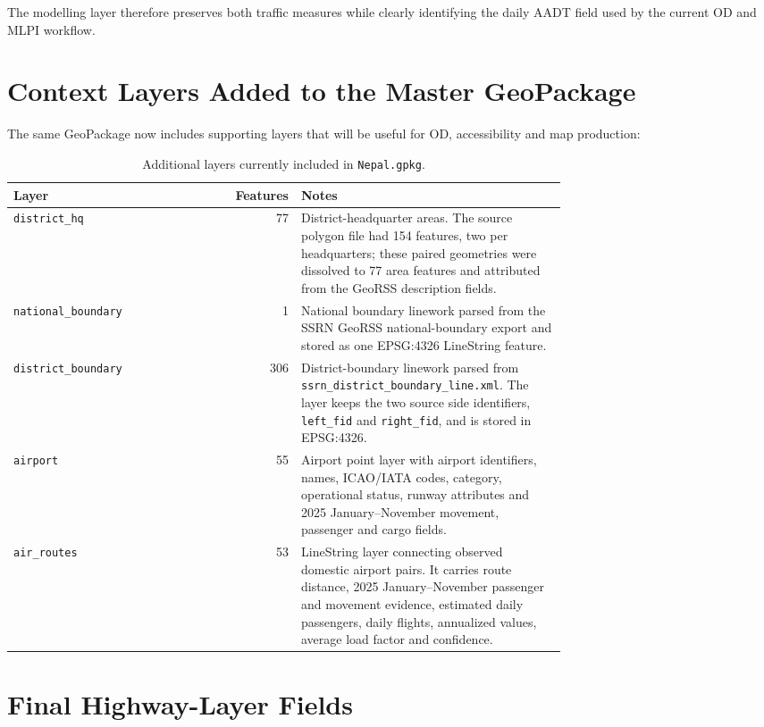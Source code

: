 \documentclass[11pt,a4paper]{article}
\begin{document}
The modelling layer therefore preserves both traffic measures while clearly
identifying the daily AADT field used by the current OD and MLPI workflow.

\section{Context Layers Added to the Master GeoPackage}

The same GeoPackage now includes supporting layers that will be useful for OD,
accessibility and map production:

\begin{table}[H]
\centering
\caption{Additional layers currently included in \texttt{Nepal.gpkg}.}
\begin{tabularx}{\linewidth}{p{0.24\linewidth} rp{0.48\linewidth}}
\toprule
\textbf{Layer} & \textbf{Features} & \textbf{Notes} \\
\midrule
\texttt{district\_hq} & 77 & District-headquarter areas. The source polygon
file had 154 features, two per headquarters; these paired geometries were
dissolved to 77 area features and attributed from the GeoRSS description
fields. \\
\texttt{national\_boundary} & 1 & National boundary linework parsed from the
SSRN GeoRSS national-boundary export and stored as one EPSG:4326 LineString
feature. \\
\texttt{district\_boundary} & 306 & District-boundary linework parsed from
\texttt{ssrn\_district\_boundary\_line.xml}. The layer keeps the two source
side identifiers, \texttt{left\_fid} and \texttt{right\_fid}, and is stored in
EPSG:4326. \\
\texttt{airport} & 55 & Airport point layer with airport identifiers, names,
ICAO/IATA codes, category, operational status, runway attributes and 2025
January--November movement, passenger and cargo fields. \\
\texttt{air\_routes} & 53 & LineString layer connecting observed domestic
airport pairs. It carries route distance, 2025 January--November passenger and
movement evidence, estimated daily passengers, daily flights, annualized values,
average load factor and confidence. \\
\bottomrule
\end{tabularx}
\end{table}

\section{Final Highway-Layer Fields}
\end{document}
